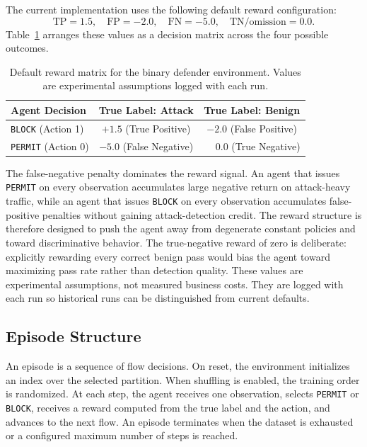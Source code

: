The current implementation uses the following default reward configuration:
\[
\text{TP}=1.5,\quad \text{FP}=-2.0,\quad \text{FN}=-5.0,\quad \text{TN/omission}=0.0.
\]
Table~\ref{tab:reward-matrix} arranges these values as a decision matrix across the four possible outcomes.

\begin{table}[htbp]
\centering
\begin{tabular}{lcc}
\toprule
Agent Decision & True Label: Attack & True Label: Benign \\
\midrule
\texttt{BLOCK} (Action 1) & $+1.5$ (True Positive) & $-2.0$ (False Positive) \\
\texttt{PERMIT} (Action 0) & $-5.0$ (False Negative) & $\phantom{-}0.0$ (True Negative) \\
\bottomrule
\end{tabular}
\caption{Default reward matrix for the binary defender environment. Values are experimental assumptions logged with each run.}
\label{tab:reward-matrix}
\end{table}

The false-negative penalty dominates the reward signal. An agent that issues \texttt{PERMIT} on every observation accumulates large negative return on attack-heavy traffic, while an agent that issues \texttt{BLOCK} on every observation accumulates false-positive penalties without gaining attack-detection credit. The reward structure is therefore designed to push the agent away from degenerate constant policies and toward discriminative behavior. The true-negative reward of zero is deliberate: explicitly rewarding every correct benign pass would bias the agent toward maximizing pass rate rather than detection quality. These values are experimental assumptions, not measured business costs. They are logged with each run so historical runs can be distinguished from current defaults.

\subsection{Episode Structure}
An episode is a sequence of flow decisions. On reset, the environment initializes an index over the selected partition. When shuffling is enabled, the training order is randomized. At each step, the agent receives one observation, selects \texttt{PERMIT} or \texttt{BLOCK}, receives a reward computed from the true label and the action, and advances to the next flow. An episode terminates when the dataset is exhausted or a configured maximum number of steps is reached.

